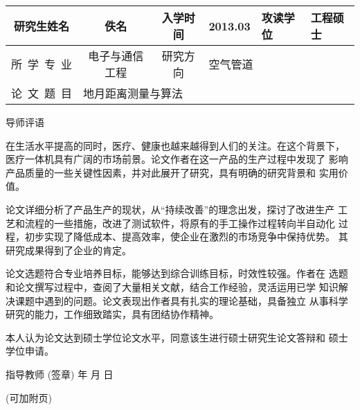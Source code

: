 \documentclass[a4paper,12pt]{article}
\newcommand*{\kaishu}{\CJKfamily{kaiti}}     %
\newcommand*{\heiti}{\CJKfamily{heiti}}     %
\begin{document}
\pagestyle{empty}
\fontsize{12}{16}\selectfont
\begin{center}
\begin{tabularx}{\textwidth}{c|c|c|c|c|X|X}
研究生姓名 & \multicolumn{2}{c|}{佚名} & 入学时间 & 2013.03 & 攻读学位
        & 工程硕士\\\hline
所~学~专~业   & \multicolumn{2}{c|}{电子与通信工程}
        & 研究方向 & \multicolumn{3}{l}{空气管道}\\\hline
论~文~题~目 & \multicolumn{6}{l}{地月距离测量与算法}\\\hline
\end{tabularx}

\fontsize{12}{14}\selectfont
\vskip 8mm
\Large \kaishu 导师评语\end{center}

\fontsize{12}{12}\selectfont

在生活水平提高的同时，医疗、健康也越来越得到人们的关注。在这个背景下，
医疗一体机具有广阔的市场前景。论文作者在这一产品的生产过程中发现了
影响产品质量的一些关键性因素，并对此展开了研究，具有明确的研究背景和
实用价值。

论文详细分析了产品生产的现状，从``持续改善''的理念出发，探讨了改进生产
工艺和流程的一些措施，改进了测试软件，将原有的手工操作过程转向半自动化
过程，初步实现了降低成本、提高效率，使企业在激烈的市场竞争中保持优势。
其研究成果得到了企业的肯定。
    
论文选题符合专业培养目标，能够达到综合训练目标，时效性较强。作者在
选题和论文撰写过程中，查阅了大量相关文献，结合工作经验，灵活运用已学
知识解决课题中遇到的问题。论文表现出作者具有扎实的理论基础，具备独立
从事科学研究的能力，工作细致踏实，具有团结协作精神。

本人认为论文达到硕士学位论文水平，同意该生进行硕士研究生论文答辩和
硕士学位申请。

\vfill
\hfill {\heiti 指导教师}\underline{\hskip 35mm} (签章)\qquad\qquad
\vskip 1cm
\hfill 年\hskip 12mm 月\hskip 12mm 日\qquad\qquad

(可加附页)
\end{document}
